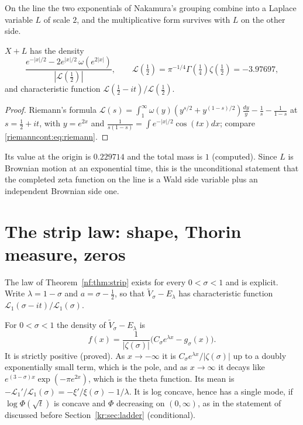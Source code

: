 On the line the two exponentials of Nakamura's grouping combine into a Laplace variable $L$ of scale $2$, and the multiplicative form survives with $L$ on the other side.
\begin{theorem}[proved]\label{nf:thm:line}
$X+L$ has the density
\[
\frac{e^{-|x|/2}-2e^{|x|/2}\,\omega(e^{2|x|})}{|\mathcal L(\frac12)|},\qquad\mathcal L(\tfrac12)=\pi^{-1/4}\Gamma(\tfrac14)\zeta(\tfrac12)=-3.97697,
\]
and characteristic function $\mathcal L(\frac12-it)/\mathcal L(\frac12)$.
\end{theorem}

\begin{proof}
Riemann's formula $\mathcal L(s)=\int_1^\infty\omega(y)(y^{s/2}+y^{(1-s)/2})\frac{dy}y-\frac1s-\frac1{1-s}$ at $s=\frac12+it$, with $y=e^{2x}$ and $\frac1{s(1-s)}=\int e^{-|x|/2}\cos(tx)dx$; compare \eqref{riemanncont:eq:riemann}.
\end{proof}

Its value at the origin is $0.229714$ and the total mass is $1$ (computed). Since $L$ is Brownian motion at an exponential time, this is the unconditional statement that the completed zeta function on the line is a Wald side variable plus an independent Brownian side one.

\section{The strip law: shape, Thorin measure, zeros}\label{nf:sec:shape}

The law of Theorem~\ref{nf:thm:strip} exists for every $0<\sigma<1$ and is explicit. Write $\lambda=1-\sigma$ and $a=\sigma-\frac12$, so that $\tilde V_\sigma-E_\lambda$ has characteristic function $\mathcal L_1(\sigma-it)/\mathcal L_1(\sigma)$.

\begin{proposition}\label{nf:prop:shape}
For $0<\sigma<1$ the density of $\tilde V_\sigma-E_\lambda$ is
\[
f(x)=\frac1{|\zeta(\sigma)|}\Big(C_\sigma e^{\lambda x}-g_\sigma(x)\Big).
\]
It is strictly positive (proved). As $x\to-\infty$ it is $C_\sigma e^{\lambda x}/|\zeta(\sigma)|$ up to a doubly exponentially small term, which is the pole, and as $x\to\infty$ it decays like $e^{(3-\sigma)x}\exp(-\pi e^{2x})$, which is the theta function. Its mean is $-\mathcal L_1'/\mathcal L_1(\sigma)=-\xi'/\xi(\sigma)-1/\lambda$. It is log concave, hence has a single mode, if $\log\Phi(\sqrt t)$ is concave and $\Phi$ decreasing on $(0,\infty)$, as in the statement of \cite{CNV86} discussed before Section~\ref{kr:sec:ladder} (conditional).
\end{proposition}

